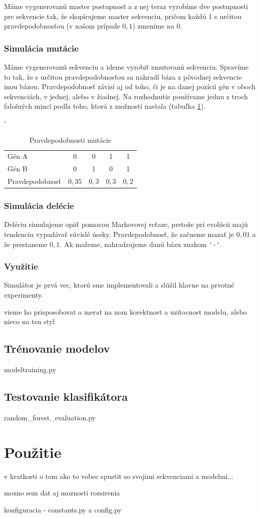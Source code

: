 
Máme vygenerovanú master postupnosť a z nej teraz vyrobíme dve postupnosti pre sekvencie tak, že skopírujeme master sekvenciu, pričom každú 1 s určitou pravdepodobnosťou (v našom prípade $0,1$) zmeníme na 0.

\subsubsection{Simulácia mutácie}

Máme vygenerovanú sekvenciu a ideme vyrobiť zmutovanú sekvenciu. Spravíme to tak, že s určitou pravdepodobnosťou sa nahradí báza z pôvodnej sekvencie inou bázou. Pravdepodobnosť závisí aj od toho, či je na danej pozícii gén v oboch sekvenciách, v jednej, alebo v žiadnej. Na rozhodnutie používame jednu z troch falošných mincí podľa toho, ktorá z možností nastala (tabuľka \ref{tab:mutation-prob}).

\begin{table}[h]
\catcode` %
\centering
\begin{tabular}{lcccc}
Gén A & 0 & 0 & 1 & 1\\
Gén B & 0 & 1 & 0 & 1\\
Pravdepodobnosť & $0,35$ & $0,3$ & $0,3$ & $0,2$\\
\end{tabular}
\caption{Pravdepodobnosti mutácie}
\label{tab:mutation-prob}
\end{table}

\subsubsection{Simulácia delécie}
Deléciu simulujeme opäť pomocou Markovovej reťaze, pretože pri evolúcii majú tendenciu vypadávať súvislé úseky. Pravdepodobnosť, že začneme mazať je $0,01$ a že prestaneme $0,1$.
Ak mažeme, nahradzujeme danú bázu znakom {\verb+'-'+}.

\subsubsection{Využitie}

Simulátor je prvá vec, ktorú sme implementovali a slúžil hlavne na prvotné experimenty.

\todo vieme ho prisposobovat a merat na nom korektnost a uzitocnost modelu, alebo nieco na ten styl

\subsection{Trénovanie modelov}
\todo modeltraining.py

\subsection{Testovanie klasifikátora}
\todo random\_forest\_evaluation.py

\section{Použitie}
\todo v kratkosti o tom ako to vobec spustit so svojimi sekvenciami a modelmi...

\todo mozno sem dat aj moznosti rozsirenia

\todo konfiguracia - constants.py a config.py
